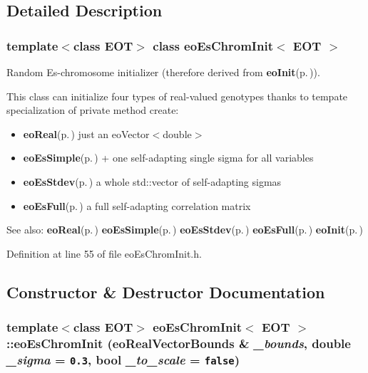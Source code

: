 \subsection{Detailed Description}
\subsubsection*{template$<$class EOT$>$ class eo\-Es\-Chrom\-Init$<$ EOT $>$}

Random Es-chromosome initializer (therefore derived from {\bf eo\-Init}{\rm (p.\,\pageref{classeo_init})}). 

This class can initialize four types of real-valued genotypes thanks to tempate specialization of private method create:

\begin{itemize}
\item {\bf eo\-Real}{\rm (p.\,\pageref{classeo_real})} just an eo\-Vector$<$double$>$\item {\bf eo\-Es\-Simple}{\rm (p.\,\pageref{classeo_es_simple})} + one self-adapting single sigma for all variables\item {\bf eo\-Es\-Stdev}{\rm (p.\,\pageref{classeo_es_stdev})} a whole std::vector of self-adapting sigmas\item {\bf eo\-Es\-Full}{\rm (p.\,\pageref{classeo_es_full})} a full self-adapting correlation matrix\end{itemize}


\begin{Desc}
\item[See also:]{\bf eo\-Real}{\rm (p.\,\pageref{classeo_real})} {\bf eo\-Es\-Simple}{\rm (p.\,\pageref{classeo_es_simple})} {\bf eo\-Es\-Stdev}{\rm (p.\,\pageref{classeo_es_stdev})} {\bf eo\-Es\-Full}{\rm (p.\,\pageref{classeo_es_full})} {\bf eo\-Init}{\rm (p.\,\pageref{classeo_init})} \end{Desc}




Definition at line 55 of file eo\-Es\-Chrom\-Init.h.

\subsection{Constructor \& Destructor Documentation}
\subsubsection{\setlength{\rightskip}{0pt plus 5cm}template$<$class EOT$>$ {\bf eo\-Es\-Chrom\-Init}$<$ {\bf EOT} $>$::{\bf eo\-Es\-Chrom\-Init} ({\bf eo\-Real\-Vector\-Bounds} \& {\em \_\-bounds}, double {\em \_\-sigma} = {\tt 0.3}, bool {\em \_\-to\_\-scale} = {\tt false})\hspace{0.3cm}{\tt  [inline]}}\label{classeo_es_chrom_init_a0}


